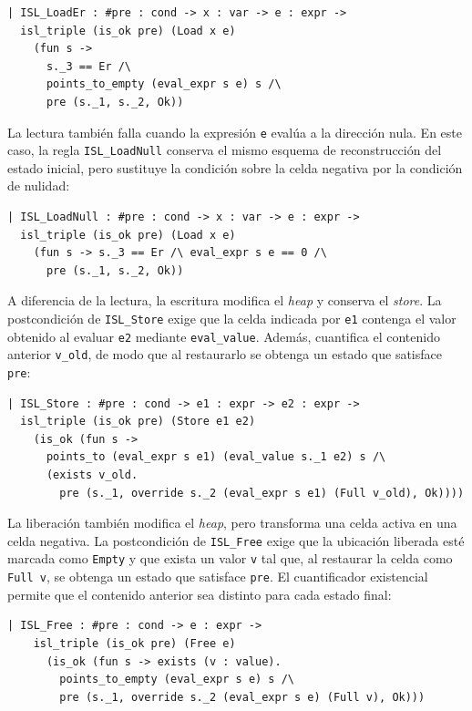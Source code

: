 \documentclass[a4paper,	11pt]{report}
\begin{document}
\begin{lstlisting}
| ISL_LoadEr : #pre : cond -> x : var -> e : expr ->
  isl_triple (is_ok pre) (Load x e)
    (fun s ->
      s._3 == Er /\
      points_to_empty (eval_expr s e) s /\
      pre (s._1, s._2, Ok))
\end{lstlisting}

La lectura también falla cuando la expresión \lstinline|e| evalúa a la dirección nula.
En este caso,
la regla \lstinline|ISL_LoadNull| conserva el mismo esquema de reconstrucción del estado inicial,
pero sustituye la condición sobre la celda negativa por la condición de nulidad:

\begin{lstlisting}
| ISL_LoadNull : #pre : cond -> x : var -> e : expr ->
  isl_triple (is_ok pre) (Load x e)
    (fun s -> s._3 == Er /\ eval_expr s e == 0 /\ 
      pre (s._1, s._2, Ok))
\end{lstlisting}

A diferencia de la lectura,
la escritura modifica el \emph{heap} y conserva el \emph{store}.
La postcondición de \lstinline|ISL_Store| exige que la celda indicada por \lstinline|e1|
contenga el valor obtenido al evaluar \lstinline|e2| mediante \lstinline|eval_value|.
Además,
cuantifica el contenido anterior \lstinline|v_old|,
de modo que al restaurarlo se obtenga un estado que satisface \lstinline|pre|:

\begin{lstlisting}
| ISL_Store : #pre : cond -> e1 : expr -> e2 : expr ->
  isl_triple (is_ok pre) (Store e1 e2)
    (is_ok (fun s ->
      points_to (eval_expr s e1) (eval_value s._1 e2) s /\
      (exists v_old. 
        pre (s._1, override s._2 (eval_expr s e1) (Full v_old), Ok))))
\end{lstlisting}

La liberación también modifica el \emph{heap},
pero transforma una celda activa en una celda negativa.
La postcondición de \lstinline|ISL_Free| exige que la ubicación liberada esté marcada como \lstinline|Empty|
y que exista un valor \lstinline|v| tal que,
al restaurar la celda como \lstinline|Full v|,
se obtenga un estado que satisface \lstinline|pre|.
El cuantificador existencial permite que el contenido anterior sea distinto para cada estado final:

\begin{lstlisting}
| ISL_Free : #pre : cond -> e : expr ->
    isl_triple (is_ok pre) (Free e)
      (is_ok (fun s -> exists (v : value).
        points_to_empty (eval_expr s e) s /\
        pre (s._1, override s._2 (eval_expr s e) (Full v), Ok)))
\end{lstlisting}
\end{document}
